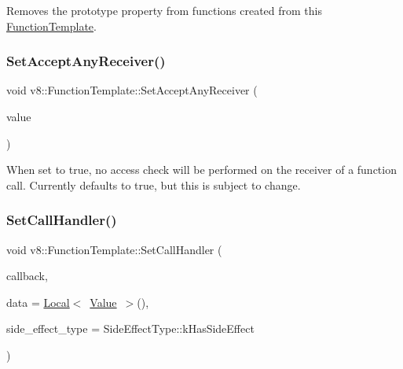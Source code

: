 Removes the prototype property from functions created from this \mbox{\hyperlink{classv8_1_1FunctionTemplate}{Function\+Template}}. \mbox{\label{classv8_1_1FunctionTemplate_a5ffdc68d8035b02ed7583950b76ef91f}} 
\subsubsection{\texorpdfstring{Set\+Accept\+Any\+Receiver()}{SetAcceptAnyReceiver()}}
{\footnotesize\ttfamily void v8\+::\+Function\+Template\+::\+Set\+Accept\+Any\+Receiver (\begin{DoxyParamCaption}\item[{bool}]{value }\end{DoxyParamCaption})}

When set to true, no access check will be performed on the receiver of a function call. Currently defaults to true, but this is subject to change. \mbox{\label{classv8_1_1FunctionTemplate_ab7b6e9d60595d4cfd6e1a6b59e625830}} 
\subsubsection{\texorpdfstring{Set\+Call\+Handler()}{SetCallHandler()}}
{\footnotesize\ttfamily void v8\+::\+Function\+Template\+::\+Set\+Call\+Handler (\begin{DoxyParamCaption}\item[{Function\+Callback}]{callback,  }\item[{\mbox{\hyperlink{classv8_1_1Local}{Local}}$<$ \mbox{\hyperlink{classv8_1_1Value}{Value}} $>$}]{data = {\ttfamily \mbox{\hyperlink{classv8_1_1Local}{Local}}$<$~\mbox{\hyperlink{classv8_1_1Value}{Value}}~$>$()},  }\item[{\mbox{\hyperlink{namespacev8_a29711319c2b9fc7716d65faee2f7b9cb}{Side\+Effect\+Type}}}]{side\+\_\+effect\+\_\+type = {\ttfamily SideEffectType\+:\+:kHasSideEffect} }\end{DoxyParamCaption})}

